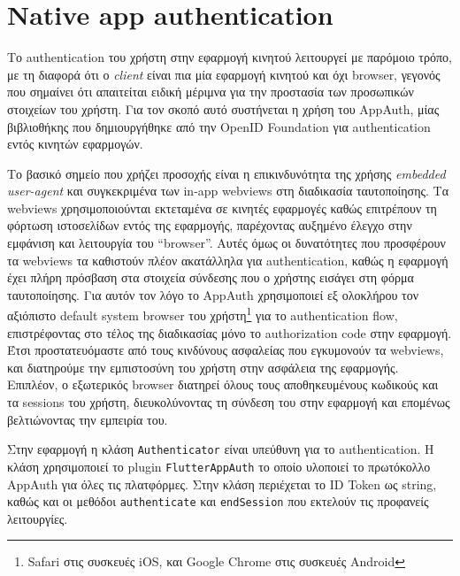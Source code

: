 \documentclass[../thesis.tex]{subfiles}
\begin{document}
\section{Native app authentication}

Το authentication του χρήστη στην εφαρμογή κινητού λειτουργεί με παρόμοιο τρόπο, με τη διαφορά ότι ο \textit{client} είναι πια μία εφαρμογή κινητού και όχι browser, γεγονός που σημαίνει ότι απαιτείται ειδική μέριμνα για την προστασία των προσωπικών στοιχείων του χρήστη.
Για τον σκοπό αυτό συστήνεται η χρήση του AppAuth, μίας βιβλιοθήκης που δημιουργήθηκε από την OpenID Foundation για authentication εντός κινητών εφαρμογών.

Το βασικό σημείο που χρήζει προσοχής είναι η επικινδυνότητα της χρήσης \textit{embedded user-agent} και συγκεκριμένα των in-app webviews στη διαδικασία ταυτοποίησης.
Τα webviews χρησιμοποιούνται εκτεταμένα σε κινητές εφαρμογές καθώς επιτρέπουν τη φόρτωση ιστοσελίδων εντός της εφαρμογής, παρέχοντας αυξημένο έλεγχο στην εμφάνιση και λειτουργία του ``browser''.
Αυτές όμως οι δυνατότητες που προσφέρουν τα webviews τα καθιστούν πλέον ακατάλληλα για authentication, καθώς η εφαρμογή έχει πλήρη πρόσβαση στα στοιχεία σύνδεσης που ο χρήστης εισάγει στη φόρμα ταυτοποίησης.\cite[\S8.12]{rfc8252}
Για αυτόν τον λόγο το AppAuth χρησιμοποιεί εξ ολοκλήρου τον αξιόπιστο default system browser του χρήστη\footnote{Safari στις συσκευές iOS, και Google Chrome στις συσκευές Android} για το authentication flow, επιστρέφοντας στο τέλος της διαδικασίας μόνο το authorization code στην εφαρμογή.
Έτσι προστατευόμαστε από τους κινδύνους ασφαλείας που εγκυμονούν τα webviews, και διατηρούμε την εμπιστοσύνη του χρήστη στην ασφάλεια της εφαρμογής.
Επιπλέον, ο εξωτερικός browser διατηρεί όλους τους αποθηκευμένους κωδικούς και τα sessions του χρήστη, διευκολύνοντας τη σύνδεση του στην εφαρμογή και επομένως βελτιώνοντας την εμπειρία του.

\bigskip

Στην εφαρμογή η κλάση \texttt{Authenticator} είναι υπεύθυνη για το authentication.
Η κλάση χρησιμοποιεί το plugin \texttt{FlutterAppAuth} το οποίο υλοποιεί το πρωτόκολλο AppAuth για όλες τις πλατφόρμες.
Στην κλάση περιέχεται το ID Token ως string, καθώς και οι μεθόδοι \texttt{authenticate} και \texttt{endSession} που εκτελούν τις προφανείς λειτουργίες.
\end{document}
